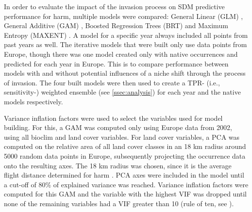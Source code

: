 \documentclass[12pt,a4paper]{article}
\begin{document}
In order to evaluate the impact of the invasion process on SDM predictive performance for \gls{harm}, multiple models were compared: General Linear (GLM) \autocite{guisan2002glm-gam}, General Additive (GAM) \autocite{guisan2002glm-gam}, Boosted Regression Trees (BRT) \autocite{elith2008brt} and Maximum Entropy (MAXENT) \autocite{phillips2017maxnet}.
A model for a specific year always included all points from past years as well.
The iterative models that were built only use data points from Europe, though there was one model created only with native occurrences and predicted for each year in Europe.
This is to compare performance between models with and without potential influences of a niche shift through the process of invasion.
The four built models were then used to create a TPR- (i.e., sensitivity-) weighted ensemble (see \ref{ssec:analysis}) for each year and the native models respectively. 

Variance inflation factors were used to select the variables used for model building.
For this, a GAM was computed only using Europe data from 2002, using all bioclim and land cover variables.
For land cover variables, a PCA was computed on the relative area of all land cover classes in an 18 km radius around 5000 random data points in Europe, subsequently projecting the occurrence data onto the resulting axes.
The 18 km radius was chosen, since it is the average flight distance determined for \gls{harm} \autocite{jeffries2013flightharmonia}.
PCA axes were included in the model until a cut-off of 80\% of explained variance was reached.
Variance inflation factors were computed for this GAM and the variable with the highest VIF was dropped until none of the remaining variables had a VIF greater than 10 (rule of ten, see \autocite{obrien2007cautionVIFs}). 
\end{document}
